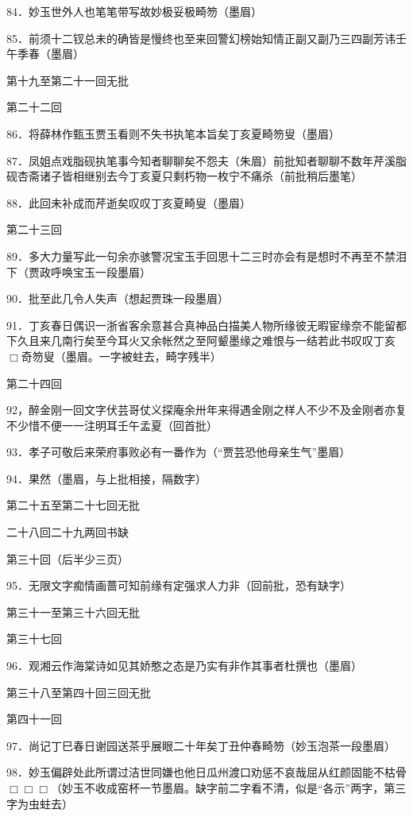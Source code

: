 84．妙玉世外人也笔笔带写故妙极妥极畸笏{（\kaishu 墨眉）}

85．前须十二钗总未的确皆是慢终也至来回警幻榜始知情正副又副乃三四副芳讳壬午季春{（\kaishu 墨眉）}

第十九至第二十一回无批

第二十二回

86．将薛林作甄玉贾玉看则不失书执笔本旨矣丁亥夏畸笏叟{（\kaishu 墨眉）}

87．凤姐点戏脂砚执笔事今知者聊聊矣不怨夫（朱眉）前批知者聊聊不数年芹溪脂砚杏斋诸子皆相继别去今丁亥夏只剩朽物一枚宁不痛杀{（\kaishu 前批稍后墨笔）}

88．此回未补成而芹逝矣叹叹丁亥夏畸叟{（\kaishu 墨眉）}

第二十三回

89．多大力量写此一句余亦骇警况宝玉手回思十二三时亦会有是想时不再至不禁泪下{（\kaishu 贾政呼唤宝玉一段墨眉）}

90．批至此几令人失声{（\kaishu 想起贾珠一段墨眉）}

91．丁亥春日偶识一浙省客余意甚合真神品白描美人物所缘彼无暇宦缘奈不能留都下久且来几南行矣至今耳火又余帐然之至阿颦墨缘之难恨与一结若此书叹叹丁亥{$\Box$}奇笏叟{（\kaishu 墨眉。一字被蛀去，畸字残半）}

第二十四回

92，醉金刚一回文字伏芸哥仗义探庵余卅年来得遇金刚之样人不少不及金刚者亦复不少惜不便一一注明耳壬午孟夏{（\kaishu 回首批）}

93．孝子可敬后来荣府事败必有一番作为{（\kaishu “贾芸恐他母亲生气”墨眉）}

94．果然{（\kaishu 墨眉，与上批相接，隔数字）}

第二十五至第二十七回无批

二十八回二十九两回书缺

第三十回（后半少三页）

95．无限文字痴情画蔷可知前缘有定强求人力非{（\kaishu 回前批，恐有缺字）}

第三十一至第三十六回无批

第三十七回

96．观湘云作海棠诗如见其娇憨之态是乃实有非作其事者杜撰也{（\kaishu 墨眉）}

第三十八至第四十回三回无批

第四十一回

97．尚记丁巳春日谢园送茶乎展眼二十年矣丁丑仲春畸笏{（\kaishu 妙玉泡茶一段墨眉）}

98．妙玉偏辟处此所谓过洁世同嫌也他日瓜州渡口劝惩不哀哉屈从红颜固能不枯骨{$\Box\Box\Box$}{（\kaishu 妙玉不收成窑杯一节墨眉。缺字前二字看不清，似是“各示”两字，第三字为虫蛀去）}

